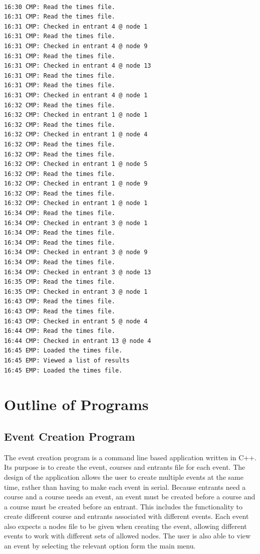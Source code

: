 \documentclass{article}
\begin{document}
\begin{center}
	\begin{lstlisting}[showstringspaces=false, caption={Output from the log file generated when creating the results shown in the listing \ref{lst:results-output}}]
	
16:30 CMP: Read the times file.
16:31 CMP: Read the times file.
16:31 CMP: Checked in entrant 4 @ node 1
16:31 CMP: Read the times file.
16:31 CMP: Checked in entrant 4 @ node 9
16:31 CMP: Read the times file.
16:31 CMP: Checked in entrant 4 @ node 13
16:31 CMP: Read the times file.
16:31 CMP: Read the times file.
16:31 CMP: Checked in entrant 4 @ node 1
16:32 CMP: Read the times file.
16:32 CMP: Checked in entrant 1 @ node 1
16:32 CMP: Read the times file.
16:32 CMP: Checked in entrant 1 @ node 4
16:32 CMP: Read the times file.
16:32 CMP: Read the times file.
16:32 CMP: Checked in entrant 1 @ node 5
16:32 CMP: Read the times file.
16:32 CMP: Checked in entrant 1 @ node 9
16:32 CMP: Read the times file.
16:32 CMP: Checked in entrant 1 @ node 1
16:34 CMP: Read the times file.
16:34 CMP: Checked in entrant 3 @ node 1
16:34 CMP: Read the times file.
16:34 CMP: Read the times file.
16:34 CMP: Checked in entrant 3 @ node 9
16:34 CMP: Read the times file.
16:34 CMP: Checked in entrant 3 @ node 13
16:35 CMP: Read the times file.
16:35 CMP: Checked in entrant 3 @ node 1
16:43 CMP: Read the times file.
16:43 CMP: Read the times file.
16:43 CMP: Checked in entrant 5 @ node 4
16:44 CMP: Read the times file.
16:44 CMP: Checked in entrant 13 @ node 4
16:45 EMP: Loaded the times file.
16:45 EMP: Viewed a list of results
16:45 EMP: Loaded the times file.

	\end{lstlisting}
\end{center}

\clearpage

\section{Outline of Programs}

\subsection{Event Creation Program}
The event creation program is a command line based application written in C++. Its purpose is to create the event, courses and entrants file for each event. The design of the application allows the user to create multiple events at the same time, rather than having to make each event in serial. Because entrants need a course and a course needs an event, an event must be created before a course and a course must be created before an entrant. This includes the functionality to create different course and entrants associated with different events. Each event also expects a nodes file to be given when creating the event, allowing different events to work with different sets of allowed nodes. The user is also able to view an event by selecting the relevant option form the main menu.
\end{document}
